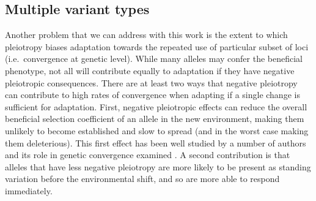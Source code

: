 \documentclass{article}
\begin{document}
\subsection{Multiple variant types}
Another problem that we can address with this work is
the extent to which pleiotropy biases 
adaptation towards the repeated use of particular subset of loci
(i.e.\ convergence at genetic level). 
While many alleles may confer the beneficial phenotype, 
not all will contribute equally to adaptation if they have negative pleiotropic consequences.
There are at least two ways that negative pleiotropy can contribute to high rates of convergence 
when adapting if a single change is sufficient for adaptation. 
First, negative pleiotropic effects can reduce 
the overall beneficial selection coefficient of an allele in the new environment,
making them unlikely to become established and slow to spread 
(and in the worst case making them deleterious). 
This first effect has been well studied by a number of authors
\citep{Orr:00,Otto:04,WelchWaxman:03,Chevin:10} and its role in genetic
convergence examined \citep{Orr:05,Chevin:10,Unckless:09}. 
A second contribution is that alleles that have
less negative pleiotropy are more likely to be present as standing variation 
before the environmental shift, and so are more able to respond
immediately.
\end{document}
